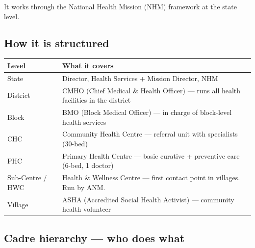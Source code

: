 \documentclass[11pt,a4paper]{article}
\begin{document}
It works through the National Health Mission (NHM) framework at the state level.

\subsection{How it is structured}

\begin{tabularx}{\textwidth}{@{}L{2.5cm} X@{}}
\toprule
\textbf{Level} & \textbf{What it covers} \\
\midrule
State & Director, Health Services + Mission Director, NHM \\
District & CMHO (Chief Medical \& Health Officer) --- runs all health facilities in the district \\
Block & BMO (Block Medical Officer) --- in charge of block-level health services \\
CHC & Community Health Centre --- referral unit with specialists (30-bed) \\
PHC & Primary Health Centre --- basic curative + preventive care (6-bed, 1 doctor) \\
Sub-Centre / HWC & Health \& Wellness Centre --- first contact point in villages. Run by ANM. \\
Village & ASHA (Accredited Social Health Activist) --- community health volunteer \\
\bottomrule
\end{tabularx}

\subsection{Cadre hierarchy --- who does what}
\end{document}
